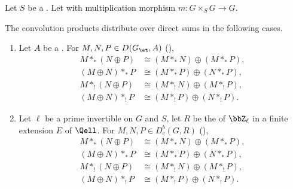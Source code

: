 \begin{proposition} \label{proposition:convolution_products_standard_and_compact_support_distribute_over_direct_sums_on_group_scheme_over_a_base}
    Let $S$ be a . Let  with multiplication morphism $m: G \times_S G \to G$.

    The convolution products  distribute over direct sums in the following cases.
    \begin{enumerate}
        \item[\textbf{(a) Torsion coefficients.}] Let $A$ be a  . For $M, N, P \in D(G_{\et}, A)$ (),
        \begin{align*}
            M *_* (N \oplus P) &\cong (M *_* N) \oplus (M *_* P), \\
            (M \oplus N) *_* P &\cong (M *_* P) \oplus (N *_* P), \\
            M *_! (N \oplus P) &\cong (M *_! N) \oplus (M *_! P), \\
            (M \oplus N) *_! P &\cong (M *_! P) \oplus (N *_! P).
        \end{align*}

        \item[\textbf{(b) Integral adic coefficients.}] Let $\ell$ be a prime invertible on $G$ and $S$, let $R$ be the  of $\bbZ_\ell$ in a finite extension $E$ of $\Qell$. For $M, N, P \in D_c^b(G,R)$ (),
        \begin{align*}
            M *_* (N \oplus P) &\cong (M *_* N) \oplus (M *_* P), \\
            (M \oplus N) *_* P &\cong (M *_* P) \oplus (N *_* P), \\
            M *_! (N \oplus P) &\cong (M *_! N) \oplus (M *_! P), \\
            (M \oplus N) *_! P &\cong (M *_! P) \oplus (N *_! P).
        \end{align*}


\end{enumerate}
\end{proposition}
